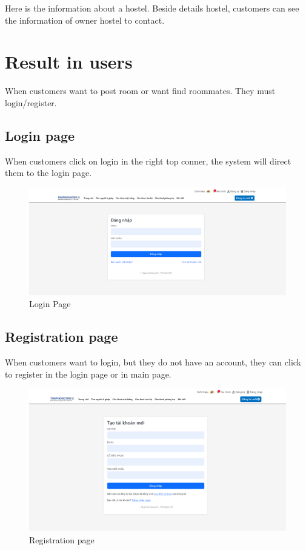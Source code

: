 \documentclass[../Main.tex]{subfiles}
\begin{document}
Here is the information about a hostel.
Beside details hostel, customers can see the information of owner hostel to contact.

\section{Result in users}

When customers want to post room or want find roommates.
They must login/register.

\subsection{Login page}

When customers click on login in the right top conner, the system will direct them to the login page.

\begin{figure}[H]
    \centering
    \includegraphics[width=\textwidth]{Figure/Picture27.png}
    \caption{Login Page}
\end{figure}

\subsection{Registration page}

When customers want to login, but they do not have an account, they can click to register in the login page or in main page.

\begin{figure}[H]
    \centering
    \includegraphics[width=\textwidth]{Figure/Picture28.png}
    \caption{Registration page}
\end{figure}
\end{document}
